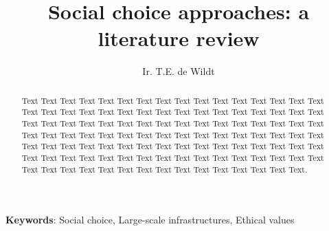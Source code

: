 \documentclass[a4paper,10pt]{article}
\title{Social choice approaches: a literature review}%
\author{Ir. T.E. de Wildt}
\date{\vspace{-0.5cm}}
\begin{document}
\maketitle
\begin{abstract}
	Text Text Text Text Text Text Text Text Text Text Text Text Text Text Text Text Text Text Text Text Text Text Text Text Text Text Text Text Text Text Text Text Text Text Text Text Text Text Text Text Text Text Text Text Text Text Text Text Text Text Text Text Text Text Text Text Text Text Text Text Text Text Text Text Text Text Text Text Text Text Text Text Text Text Text Text Text Text Text Text Text Text Text Text Text Text Text Text Text Text Text Text Text Text Text Text Text Text Text Text Text Text Text Text Text Text Text Text Text Text Text.
\end{abstract}
		
{\bfseries Keywords}: Social choice, Large-scale infrastructures, Ethical values
		
\end{document}
